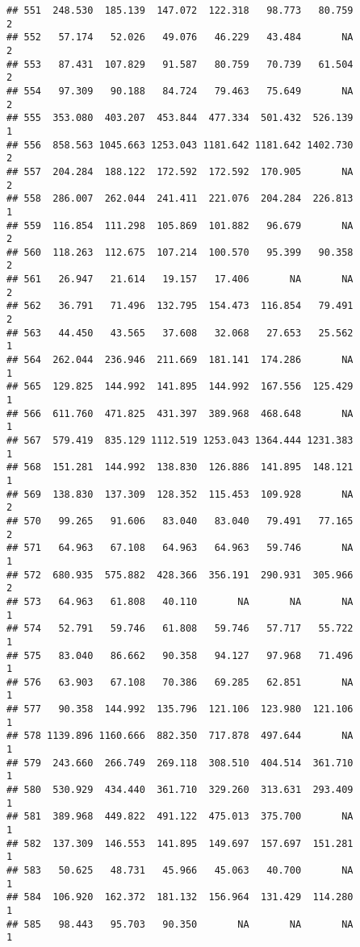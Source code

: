 \documentclass[
]{article}
\begin{document}
\begin{verbatim}
## 551  248.530  185.139  147.072  122.318   98.773   80.759             2
## 552   57.174   52.026   49.076   46.229   43.484       NA             2
## 553   87.431  107.829   91.587   80.759   70.739   61.504             2
## 554   97.309   90.188   84.724   79.463   75.649       NA             2
## 555  353.080  403.207  453.844  477.334  501.432  526.139             1
## 556  858.563 1045.663 1253.043 1181.642 1181.642 1402.730             2
## 557  204.284  188.122  172.592  172.592  170.905       NA             2
## 558  286.007  262.044  241.411  221.076  204.284  226.813             1
## 559  116.854  111.298  105.869  101.882   96.679       NA             2
## 560  118.263  112.675  107.214  100.570   95.399   90.358             2
## 561   26.947   21.614   19.157   17.406       NA       NA             2
## 562   36.791   71.496  132.795  154.473  116.854   79.491             2
## 563   44.450   43.565   37.608   32.068   27.653   25.562             1
## 564  262.044  236.946  211.669  181.141  174.286       NA             1
## 565  129.825  144.992  141.895  144.992  167.556  125.429             1
## 566  611.760  471.825  431.397  389.968  468.648       NA             1
## 567  579.419  835.129 1112.519 1253.043 1364.444 1231.383             1
## 568  151.281  144.992  138.830  126.886  141.895  148.121             1
## 569  138.830  137.309  128.352  115.453  109.928       NA             2
## 570   99.265   91.606   83.040   83.040   79.491   77.165             2
## 571   64.963   67.108   64.963   64.963   59.746       NA             1
## 572  680.935  575.882  428.366  356.191  290.931  305.966             2
## 573   64.963   61.808   40.110       NA       NA       NA             1
## 574   52.791   59.746   61.808   59.746   57.717   55.722             1
## 575   83.040   86.662   90.358   94.127   97.968   71.496             1
## 576   63.903   67.108   70.386   69.285   62.851       NA             1
## 577   90.358  144.992  135.796  121.106  123.980  121.106             1
## 578 1139.896 1160.666  882.350  717.878  497.644       NA             1
## 579  243.660  266.749  269.118  308.510  404.514  361.710             1
## 580  530.929  434.440  361.710  329.260  313.631  293.409             1
## 581  389.968  449.822  491.122  475.013  375.700       NA             1
## 582  137.309  146.553  141.895  149.697  157.697  151.281             1
## 583   50.625   48.731   45.966   45.063   40.700       NA             1
## 584  106.920  162.372  181.132  156.964  131.429  114.280             1
## 585   98.443   95.703   90.350       NA       NA       NA             1

\end{verbatim}
\end{document}
